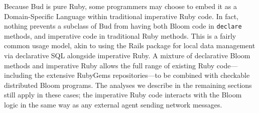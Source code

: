 Because Bud is pure Ruby, some programmers may choose to embed it as a Domain-Specific Language within traditional imperative Ruby code.  In fact, nothing prevents a subclass of Bud from having both Bloom code in \texttt{declare} methods, and imperative code in traditional Ruby methods.  This is a fairly common usage model, akin to using the Rails package for local data management via declarative SQL alongside imperative Ruby. A mixture of declarative Bloom methods and imperative Ruby allows the full range of existing Ruby code---including the extensive RubyGems repositories---to be combined with checkable distributed Bloom programs. The analyses we describe in the remaining sections still apply in these cases; the imperative Ruby code interacts with the Bloom logic in the same way as any external agent sending network messages.